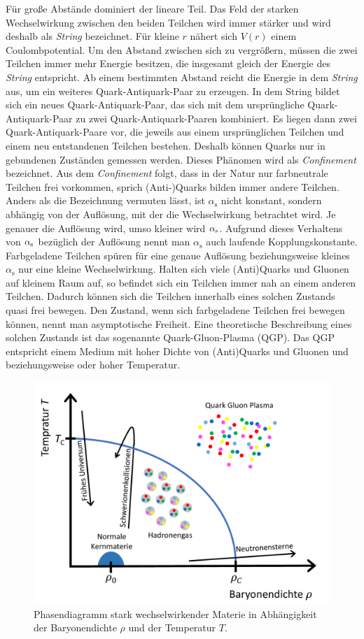 F\"ur gro{\ss}e Abst\"ande dominiert der lineare Teil.
Das Feld der starken Wechselwirkung zwischen den beiden Teilchen wird immer st\"arker und wird deshalb als \textit{String} bezeichnet.
F\"ur kleine $r$ n\"ahert sich $V(r)$ einem Coulombpotential.
\newline
Um den Abstand zwischen sich zu vergr\"o{\ss}ern, m\"ussen die zwei Teilchen immer mehr Energie besitzen, die insgesamt gleich der Energie des \textit{String} entspricht.
Ab einem bestimmten Abstand reicht die Energie in dem \textit{String} aus, um ein weiteres Quark-Antiquark-Paar zu erzeugen.
In dem String bildet sich ein neues Quark-Antiquark-Paar, das sich mit dem urspr\"ungliche Quark-Antiquark-Paar zu zwei Quark-Antiquark-Paaren kombiniert.
Es liegen dann zwei Quark-Antiquark-Paare vor, die jeweils aus einem urspr\"unglichen Teilchen und einem neu entstandenen Teilchen bestehen.
Deshalb k\"onnen Quarks nur in gebundenen Zust\"anden gemessen werden.
Dieses Ph\"anomen wird als \textit{Confinement} bezeichnet.
Aus dem \textit{Confinement} folgt, dass in der Natur nur farbneutrale Teilchen frei vorkommen, sprich (Anti-)Quarks bilden immer andere Teilchen.%
\newline
Anders als die Bezeichnung vermuten l\"asst, ist $\alpha_\text{s}$ nicht konstant, sondern abh\"angig von der Aufl\"osung, mit der die Wechselwirkung betrachtet wird.
Je genauer die Aufl\"osung wird, umso kleiner wird $\alpha_{\rm{s}}$.
Aufgrund dieses Verhaltens von $\alpha_{\rm{s}}$ bez\"uglich der Aufl\"osung nennt man $\alpha_\text{s}$ auch laufende Kopplungskonstante.
Farbgeladene Teilchen sp\"uren f\"ur eine genaue Aufl\"osung beziehungsweise kleines $\alpha_\text{s}$ nur eine kleine Wechselwirkung.
Halten sich viele (Anti)Quarks und Gluonen auf kleinem Raum auf, so befindet sich ein Teilchen immer nah an einem anderen Teilchen.
Dadurch k\"onnen sich die Teilchen innerhalb eines solchen Zustands quasi frei bewegen.
Den Zustand, wenn sich farbgeladene Teilchen frei bewegen k\"onnen, nennt man asymptotische Freiheit.
\newline
Eine theoretische Beschreibung eines solchen Zustands ist das sogenannte Quark-Gluon-Plasma (QGP).
Das QGP entspricht einem Medium mit hoher Dichte von (Anti)Quarks und Gluonen und beziehungsweise oder hoher Temperatur.
\begin{figure}[tp]
\centering
\includegraphics[width=.6\linewidth]{QCD_phase_diagram.pdf}
\caption{Phasendiagramm stark wechselwirkender Materie in Abh\"angigkeit der Baryonendichte $\rho$ und der Temperatur $T$.
\cite{Thesis:Tim}}
\label{fig:QGPPhase}
\end{figure}
